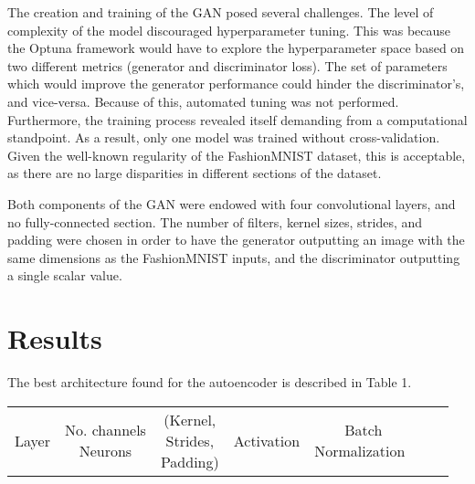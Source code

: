 \documentclass[11pt]{article} %
\begin{document}
\noindent The creation and training of the GAN posed several challenges. The level of complexity of the model discouraged hyperparameter tuning. This was because the Optuna framework would have to explore the hyperparameter space based on two different metrics (generator and discriminator loss). The set of parameters which would improve the generator performance could hinder the discriminator's, and vice-versa. Because of this, automated tuning was not performed. Furthermore, the training process revealed itself demanding from a computational standpoint. As a result, only one model was trained without cross-validation. Given the well-known regularity of the FashionMNIST dataset, this is acceptable, as there are no large disparities in different sections of the dataset.

\noindent Both components of the GAN were endowed with four convolutional layers, and no fully-connected section. The number of filters, kernel sizes, strides, and padding were chosen in order to have the generator outputting an image with the same dimensions as the FashionMNIST inputs, and the discriminator outputting a single scalar value.

\section*{Results}

\noindent The best architecture found for the autoencoder is described in Table 1.

\begin{table}[b]

    \begin{tabular}{ccccccc}
        Layer & \thead{No. channels \\ Neurons} & \thead{(Kernel,\\ Strides,\\ Padding)} & Activation & \thead{Batch \\ Normalization}\
    \end{tabular}
\end{table}
\end{document}
